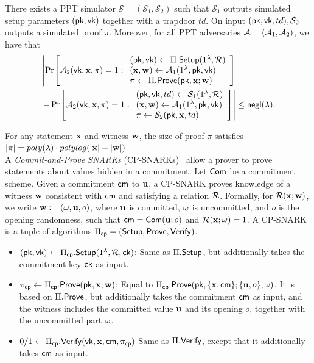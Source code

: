\documentclass[letterpaper,twocolumn,10pt]{article}
\begin{document}
There exists a PPT simulator $\mathcal{S} = (\mathcal{S}_1, \mathcal{S}_2)$ such that $\mathcal{S}_1$ outputs simulated setup parameters $({\sf pk}, {\sf vk})$ together with a trapdoor $td$. On input $({\sf pk}, {\sf vk}, td), \mathcal{S}_2$ outputs a simulated proof $\pi$. Moreover, for all PPT adversaries $\mathcal{A} = ({\mathcal{A}}_1, {\mathcal{A}}_2)$, we have that
\begin{align*}
    &\left|
    \Pr\!\left[
      {\mathcal{A}}_2({\sf vk}, {\mathbf{x}}, \pi) = 1 :
      \begin{array}{l}
        ({\sf pk},{\sf vk})\leftarrow \Pi.{\sf Setup}(1^\lambda, {\mathcal{R}}) \\
        ({\mathbf{x}}, {\mathbf{w}}) \gets {\mathcal{A}}_1(1^\lambda, {\sf pk}, {\sf vk}) \\
        \pi\leftarrow \Pi.{\sf Prove}({\sf pk}, {\mathbf{x}}; {\mathbf{w}})
      \end{array}
    \right]
    \right. \nonumber\\
    &\left.
    -
    \Pr\!\left[
      {\mathcal{A}}_2({\sf vk}, {\mathbf{x}}, \pi) = 1 :
      \begin{array}{l}
        ({\sf pk},{\sf vk},td)\leftarrow \mathcal{S}_1(1^\lambda, {\mathcal{R}}) \\
        ({\mathbf{x}}, {\mathbf{w}}) \gets {\mathcal{A}}_1(1^\lambda, {\sf pk}, {\sf vk}) \\
        \pi\leftarrow \mathcal{S}_2({\sf pk}, {\mathbf{x}}, td)
      \end{array}
    \right]
    \right|
    \le {\sf negl}(\lambda).
\end{align*}

 For any statement ${\mathbf{x}}$ and witness ${\mathbf{w}}$, the size of proof $\pi$ satisfies $|\pi| = poly(\lambda)\cdot polylog(|{\mathbf{x}}| + |{\mathbf{w}}|)$ \\


A \textit{Commit-and-Prove SNARKs} (CP-SNARKs)~\cite{Legosnark, Lunar} allow a prover to prove statements about values hidden in a commitment. Let ${\sf Com}$ be a commitment scheme. Given a commitment ${\sf cm}$ to ${\mathbf{u}}$, a CP-SNARK proves knowledge of a witness ${\mathbf{w}}$ consistent with ${\sf cm}$ and satisfying a relation ${\mathcal{R}}$. Formally, for ${\mathcal{R}}({\mathbf{x}};{\mathbf{w}})$, we write ${\mathbf{w}} := ({\mathbf{\omega}}, {\mathbf{u}}, o)$, where ${\mathbf{u}}$ is committed, ${\mathbf{\omega}}$ is uncommitted, and $o$ is the opening randomness, such that ${\sf cm}={\sf Com}({\mathbf{u}}; o)$ and ${\mathcal{R}}({\mathbf{x}}; {\mathbf{\omega}})=1$. A CP-SNARK is a tuple of algorithms $\Pi_{{\sf cp}}=({\sf Setup},{\sf Prove},{\sf Verify})$.
\begin{itemize}
    \item $({\sf pk}, {\sf vk}) \gets \Pi_{\sf cp}.{\sf Setup}(1^\lambda, {\mathcal{R}}, {\sf ck})$: Same as $\Pi.{\sf Setup}$, but additionally takes the commitment key ${\sf ck}$ as input.
    \item $\pi_{{\sf cp}} \gets \Pi_{\sf cp}.{\sf Prove}({\sf pk}, {\mathbf{x}}; {\mathbf{w}})$:
    Equal to $\Pi_{\sf cp}.{\sf Prove}({\sf pk}, \{{\mathbf{x}},{\sf cm}\}; \{{\mathbf{u}},o\}, {\mathbf{\omega}})$.
    It is based on $\Pi.{\sf Prove}$, but additionally takes the commitment ${\sf cm}$ as input, and the witness includes the committed value ${\mathbf{u}}$ and its opening $o$, together with the uncommitted part ${\mathbf{\omega}}$.
    \item $0/1 \gets \Pi_{\sf cp}.{\sf Verify}({\sf vk}, {\mathbf{x}}, {\sf cm}, \pi_{\sf cp})$ Same as $\Pi.{\sf Verify}$, except that it additionally takes ${\sf cm}$ as input.
\end{itemize}
\end{document}
